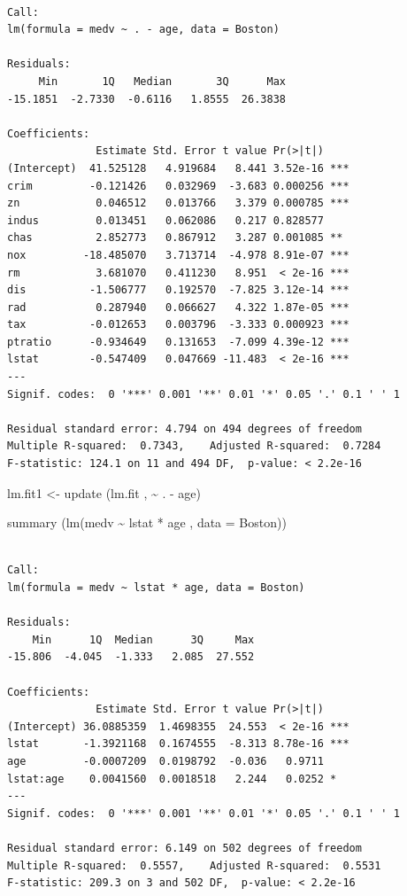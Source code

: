 \documentclass[
  letterpaper,
  DIV=11,
  numbers=noendperiod]{scrartcl}
\newenvironment{Shaded}{\begin{snugshade}}{\end{snugshade}}
\newcommand{\AttributeTok}[1]{\textcolor[rgb]{0.40,0.45,0.13}{#1}}
\newcommand{\FunctionTok}[1]{\textcolor[rgb]{0.28,0.35,0.67}{#1}}
\newcommand{\NormalTok}[1]{\textcolor[rgb]{0.00,0.23,0.31}{#1}}
\newcommand{\OtherTok}[1]{\textcolor[rgb]{0.00,0.23,0.31}{#1}}
\newcommand{\SpecialCharTok}[1]{\textcolor[rgb]{0.37,0.37,0.37}{#1}}
\begin{document}
\begin{verbatim}

Call:
lm(formula = medv ~ . - age, data = Boston)

Residuals:
     Min       1Q   Median       3Q      Max 
-15.1851  -2.7330  -0.6116   1.8555  26.3838 

Coefficients:
              Estimate Std. Error t value Pr(>|t|)    
(Intercept)  41.525128   4.919684   8.441 3.52e-16 ***
crim         -0.121426   0.032969  -3.683 0.000256 ***
zn            0.046512   0.013766   3.379 0.000785 ***
indus         0.013451   0.062086   0.217 0.828577    
chas          2.852773   0.867912   3.287 0.001085 ** 
nox         -18.485070   3.713714  -4.978 8.91e-07 ***
rm            3.681070   0.411230   8.951  < 2e-16 ***
dis          -1.506777   0.192570  -7.825 3.12e-14 ***
rad           0.287940   0.066627   4.322 1.87e-05 ***
tax          -0.012653   0.003796  -3.333 0.000923 ***
ptratio      -0.934649   0.131653  -7.099 4.39e-12 ***
lstat        -0.547409   0.047669 -11.483  < 2e-16 ***
---
Signif. codes:  0 '***' 0.001 '**' 0.01 '*' 0.05 '.' 0.1 ' ' 1

Residual standard error: 4.794 on 494 degrees of freedom
Multiple R-squared:  0.7343,    Adjusted R-squared:  0.7284 
F-statistic: 124.1 on 11 and 494 DF,  p-value: < 2.2e-16
\end{verbatim}

\begin{Shaded}
\begin{Highlighting}[]
\NormalTok{ lm.fit1 }\OtherTok{\textless{}{-}} \FunctionTok{update}\NormalTok{ (lm.fit , }\SpecialCharTok{\textasciitilde{}}\NormalTok{ . }\SpecialCharTok{{-}}\NormalTok{ age)}
\end{Highlighting}
\end{Shaded}

\begin{Shaded}
\begin{Highlighting}[]
\FunctionTok{summary}\NormalTok{ (}\FunctionTok{lm}\NormalTok{(medv }\SpecialCharTok{\textasciitilde{}}\NormalTok{ lstat }\SpecialCharTok{*}\NormalTok{ age , }\AttributeTok{data =}\NormalTok{ Boston))}
\end{Highlighting}
\end{Shaded}

\begin{verbatim}

Call:
lm(formula = medv ~ lstat * age, data = Boston)

Residuals:
    Min      1Q  Median      3Q     Max 
-15.806  -4.045  -1.333   2.085  27.552 

Coefficients:
              Estimate Std. Error t value Pr(>|t|)    
(Intercept) 36.0885359  1.4698355  24.553  < 2e-16 ***
lstat       -1.3921168  0.1674555  -8.313 8.78e-16 ***
age         -0.0007209  0.0198792  -0.036   0.9711    
lstat:age    0.0041560  0.0018518   2.244   0.0252 *  
---
Signif. codes:  0 '***' 0.001 '**' 0.01 '*' 0.05 '.' 0.1 ' ' 1

Residual standard error: 6.149 on 502 degrees of freedom
Multiple R-squared:  0.5557,    Adjusted R-squared:  0.5531 
F-statistic: 209.3 on 3 and 502 DF,  p-value: < 2.2e-16
\end{verbatim}
\end{document}
